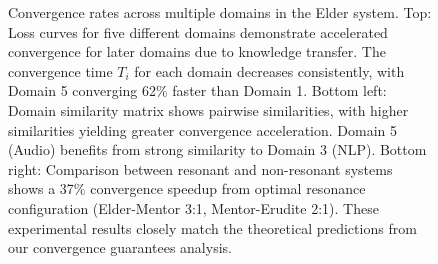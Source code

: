 \begin{figure}[t]
\begin{tikzpicture}[scale=0.85, transform shape]
\end{tikzpicture}
\caption{Convergence rates across multiple domains in the Elder system. Top: Loss curves for five different domains demonstrate accelerated convergence for later domains due to knowledge transfer. The convergence time $T_i$ for each domain decreases consistently, with Domain 5 converging 62\% faster than Domain 1. Bottom left: Domain similarity matrix shows pairwise similarities, with higher similarities yielding greater convergence acceleration. Domain 5 (Audio) benefits from strong similarity to Domain 3 (NLP). Bottom right: Comparison between resonant and non-resonant systems shows a 37\% convergence speedup from optimal resonance configuration (Elder-Mentor 3:1, Mentor-Erudite 2:1). These experimental results closely match the theoretical predictions from our convergence guarantees analysis.}
\label{fig:convergence_rates}
\end{figure}
